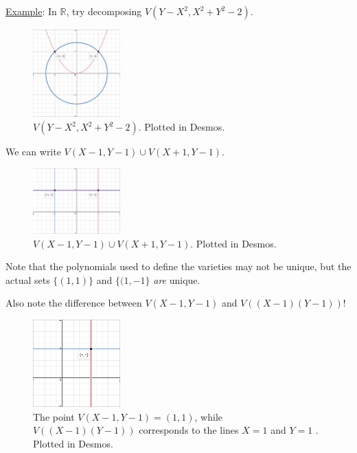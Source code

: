 \documentclass[12pt]{article}
\newcommand{\real}{\mathbb{R}}
\newcommand{\ita}[1]{\textit{#1}}
\theoremstyle{definition}
\begin{document}
\underline{Example}: In $\real$, try decomposing $V(Y-X^2,X^2+Y^2-2)$.
\begin{figure}[H]
    \centering
    \includegraphics[width=0.3\textwidth]{10.png}
    \caption{$V(Y-X^2,X^2+Y^2-2)$. Plotted in Desmos.}
\end{figure}
We can write $V(X-1,Y-1)\cup V(X+1,Y-1)$.
\begin{figure}[H]
    \centering
    \includegraphics[width=0.3\textwidth]{11.png}
    \caption{$V(X-1,Y-1)\cup V(X+1,Y-1)$. Plotted in Desmos.}
\end{figure}
Note that the polynomials used to define the varieties may not be unique, but the actual sets $\{(1,1)\}$ and $\{(1,-1\}$ \ita{are} unique.

Also note the difference between $V(X-1,Y-1)$ and $V((X-1)(Y-1))$!
\begin{figure}[H]
    \centering
    \includegraphics[width=0.3\textwidth]{12.png}
    \caption{The point $V(X-1,Y-1)=(1,1)$, while $V((X-1)(Y-1))$ corresponds to the lines $X=1$ and $Y=1$ . Plotted in Desmos.}
\end{figure}
\end{document}
